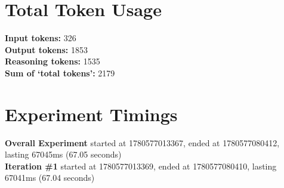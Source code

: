 \documentclass{article}
\begin{document}
\section*{Total Token Usage}
\textbf{Input tokens: }326
\\\textbf{Output tokens: }1853
\\\textbf{Reasoning tokens: }1535
\\\textbf{Sum of `total tokens': }2179
\section*{Experiment Timings}
\textbf{Overall Experiment} started at 1780577013367, ended at 1780577080412, lasting 67045ms (67.05 seconds)
\\\textbf{Iteration \#1} started at 1780577013369, ended at 1780577080410, lasting 67041ms (67.04 seconds)
\end{document}
